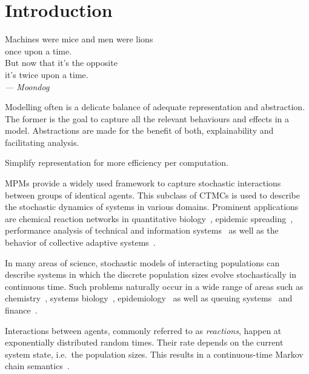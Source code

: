 \chapter{Introduction}
\begin{flushright}
 Machines were mice and men were lions\\
    once upon a time.\\
    But now that it's the opposite\\
    it's twice upon a time.\\
    \medskip
        \emph{--- Moondog}
\end{flushright}
\noindent
Modelling often is a delicate balance of adequate representation and abstraction.
The former is the goal to capture all the relevant behaviours and effects in a model.
Abstractions are made for the benefit of both, explainability and facilitating analysis.

Simplify representation for more efficiency per computation.



\Acfp{MPM} provide a
widely used framework to capture stochastic interactions between groups of identical agents.
This subclass of \acfp{CTMC}  is used
to describe the stochastic dynamics of systems in various domains.
Prominent applications are chemical reaction networks in quantitative
biology~\parencite{BuchWolkenhauer},
epidemic spreading~\parencite{porter2016dynamical}, performance analysis  of technical and
information systems~\parencite{bortolussi2013continuous,gast2019} as well as the behavior of
collective adaptive systems~\parencite{bernardo2016}.








In many areas of science, stochastic models  of interacting populations can describe systems in which the discrete population sizes evolve stochastically in continuous time.
Such problems naturally occur in a wide range of areas such as chemistry~\parencite{gillespie1977exact}, systems biology~\parencite{wilkinson2018stochastic,ullah2011stochastic}, epidemiology~\parencite{mode2000stochastic} as well as    queuing systems~\parencite{breuer2003markov} and finance~\parencite{pardoux2008markov}.

Interactions between agents, commonly referred to as \emph{reactions}, happen at exponentially distributed random times. 
Their rate depends on the current system state, i.e.\ the population sizes.
This results in a continuous-time Markov chain semantics~\parencite{anderson2012continuous}.




